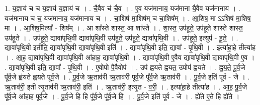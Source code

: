 \documentclass[17pt]{extarticle}
\begin{document}
1. य॒ज्ञाय॑ च च य॒ज्ञाय॑ य॒ज्ञाय॑ च । . चै॒वैव च॑ चै॒व । . ए॒व यज॑मानाय॒ यज॑माना यै॒वैव यज॑मानाय । . यज॑मानाय च च॒ यज॑मानाय॒ यज॑मानाय च । . चा॒शिष॑ मा॒शिष॑म् च चा॒शिष᳚म् । . आ॒शिष॒ मा ऽऽशिष॑ मा॒शिष॒ मा । . आ॒शिष॒मित्या᳚ - शिष᳚म् । . आ शा᳚स्ते शास्त॒ आ शा᳚स्ते । . शा॒स्त॒ उप॑हूते॒ उप॑हूते शास्ते शास्त॒ उप॑हूते । . उप॑हूते॒ द्यावा॑पृथि॒वी द्यावा॑पृथि॒वी उप॑हूते॒ उप॑हूते॒ द्यावा॑पृथि॒वी । . उप॑हूते॒ इत्युप॑ - हू॒ते॒ । . द्यावा॑पृथि॒वी इतीति॒ द्यावा॑पृथि॒वी द्यावा॑पृथि॒वी इति॑ । . द्यावा॑पृथि॒वी इति॒ द्यावा᳚ - पृ॒थि॒वी । . इत्या॑हा॒हे तीत्या॑ह । . आ॒ह॒ द्यावा॑पृथि॒वी द्यावा॑पृथि॒वी आ॑हाह॒ द्यावा॑पृथि॒वी । . द्यावा॑पृथि॒वी ए॒वैव द्यावा॑पृथि॒वी द्यावा॑पृथि॒वी ए॒व । . द्यावा॑पृथि॒वी इति॒ द्यावा᳚ - पृ॒थि॒वी । . ए॒वोपो पै॒वैवोप॑ । . उप॑ ह्वयते ह्वयत॒ उपोप॑ ह्वयते । . ह्व॒य॒ते॒ पू॒र्व॒जे पू᳚र्व॒जे ह्व॑यते ह्वयते पूर्व॒जे । . पू॒र्व॒जे ऋ॒ताव॑री ऋ॒ताव॑री पूर्व॒जे पू᳚र्व॒जे ऋ॒ताव॑री । . पू॒र्व॒जे इति॑ पूर्व - जे । . ऋ॒ताव॑री॒ इती त्यृ॒ताव॑री ऋ॒ताव॑री॒ इति॑ । . ऋ॒ताव॑री॒ इत्यृ॒त - व॒री॒ । . इत्या॑हा॒हे तीत्या॑ह । . आ॒ह॒ पू॒र्व॒जे पू᳚र्व॒जे आ॑हाह पूर्व॒जे । . पू॒र्व॒जे हि हि पू᳚र्व॒जे पू᳚र्व॒जे हि । . पू॒र्व॒जे इति॑ पूर्व - जे । . ह्ये॑ते ए॒ते हि ह्ये॑ते । \newline
\end{document}
